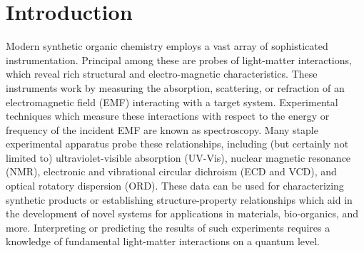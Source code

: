 \chapter{Introduction} \label{ch:int}

Modern synthetic organic chemistry employs a vast array of sophisticated
instrumentation.  Principal among these are probes of light-matter
interactions, which reveal rich structural and electro-magnetic
characteristics. These instruments work by measuring the absorption,
scattering, or refraction of an electromagnetic field (EMF) interacting
with a target system.\cite{Barron2004} Experimental techniques which
measure these interactions with respect to the energy or frequency of
the incident EMF are known as spectroscopy. Many staple experimental
apparatus probe these relationships, including (but certainly not limited
to) 
ultraviolet-visible absorption (UV-Vis), 
nuclear magnetic resonance (NMR),
electronic and vibrational circular dichroism (ECD and VCD), and 
optical rotatory dispersion (ORD).
These data can be used for characterizing synthetic products or
establishing structure-property relationships which aid in the development
of novel systems for applications in materials, bio-organics, and more.
Interpreting or predicting the results of such experiments requires a
knowledge of fundamental light-matter interactions on a quantum level.

